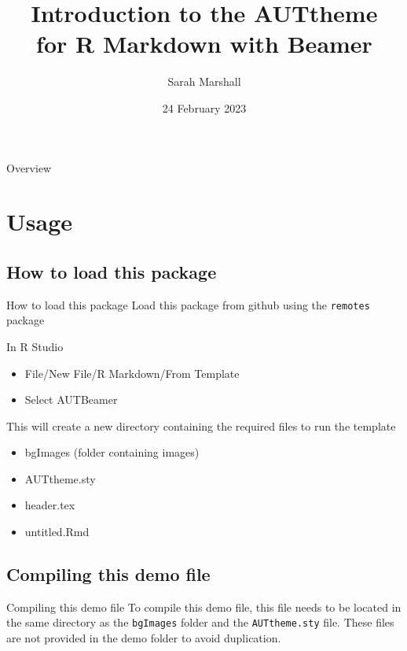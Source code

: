 \documentclass[
  ignorenonframetext,
  aspectratio=169]{beamer}
\title{Introduction to the AUTtheme\\
for R Markdown with Beamer}
\author{Sarah Marshall}
\date{24 February 2023}
\institute{Department of Mathematical Sciences\\
Auckland University of Technology}
\providecommand{\tightlist}{%
  \setlength{\itemsep}{0pt}\setlength{\parskip}{0pt}}
\begin{document}
\frame{\titlepage}

\begin{frame}{Overview}
\protect\hypertarget{overview}{}
\tableofcontents[hideallsubsections]
\end{frame}

\hypertarget{usage}{%
\section{Usage}\label{usage}}

\hypertarget{how-to-load-this-package}{%
\subsection{How to load this package}\label{how-to-load-this-package}}

\begin{frame}[fragile]{How to load this package}
Load this package from github using the \texttt{remotes} package

In R Studio

\begin{itemize}
\tightlist
\item
  File/New File/R Markdown/From Template
\item
  Select AUTBeamer
\end{itemize}

This will create a new directory containing the required files to run
the template

\begin{itemize}
\tightlist
\item
  bgImages (folder containing images)
\item
  AUTtheme.sty
\item
  header.tex
\item
  untitled.Rmd
\end{itemize}
\end{frame}

\hypertarget{compiling-this-demo-file}{%
\subsection{Compiling this demo file}\label{compiling-this-demo-file}}

\begin{frame}[fragile]{Compiling this demo file}
To compile this demo file, this file needs to be located in the same
directory as the \texttt{bgImages} folder and the \texttt{AUTtheme.sty}
file. These files are not provided in the demo folder to avoid
duplication.
\end{frame}
\end{document}
